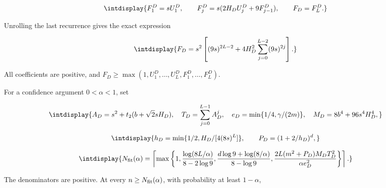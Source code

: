 \begingroup\renewcommand{\theHequation}{intdisplay.45}
\begin{equation*}
\intdisplay{
F_1^D=sU_1^D,\qquad
F_j^D=s(2H_DU_j^D+9F_{j-1}^D),\qquad F_D=F_L^D.
}
\end{equation*}
\endgroup


Unrolling the last recurrence gives the exact expression


\begingroup\renewcommand{\theHequation}{intdisplay.46}
\begin{equation*}
\intdisplay{
F_D=s^2\left[(9s)^{2L-2}
       +4H_D^2\sum_{j=0}^{L-2}(9s)^{2j}\right].
}
\end{equation*}
\endgroup


All coefficients are positive, and \(F_D\ge\max(1,\allowbreak U_1^D,\allowbreak \ldots,\allowbreak U_L^D,\allowbreak F_1^D,\allowbreak \ldots,\allowbreak F_L^D)\).



For a confidence argument \(0<\alpha<1\), set


\begingroup\renewcommand{\theHequation}{intdisplay.47}
\begin{equation*}
\intdisplay{
A_D=s^2+t_2(b+\sqrt2sH_D),\quad
T_D=\sum_{j=0}^{L-1}A_D^j,\quad
e_D=\min\{1/4,\gamma/(2m)\},\quad
M_D=8b^4+96s^4H_D^4,
}
\end{equation*}
\endgroup

\begingroup\renewcommand{\theHequation}{intdisplay.48}
\begin{equation*}
\intdisplay{
h_D=\min\{1/2,H_D/[4(8s)^L]\},\qquad P_D=(1+2/h_D)^d,
}
\end{equation*}
\endgroup

\begingroup\renewcommand{\theHequation}{intdisplay.49}
\begin{equation*}
\intdisplay{
N_{\rm fit}(\alpha)=\left\lceil\max\left\{
1,\frac{\log(8L/\alpha)}{8-2\log9},
\frac{d\log9+\log(8/\alpha)}{8-\log9},
\frac{2L(m^2+P_D)M_DT_D^2}{\alpha e_D^2}
\right\}\right\rceil.
}
\end{equation*}
\endgroup


The denominators are positive. At every \(n\ge N_{\rm fit}(\alpha)\), with probability at least \(1-\alpha\),


